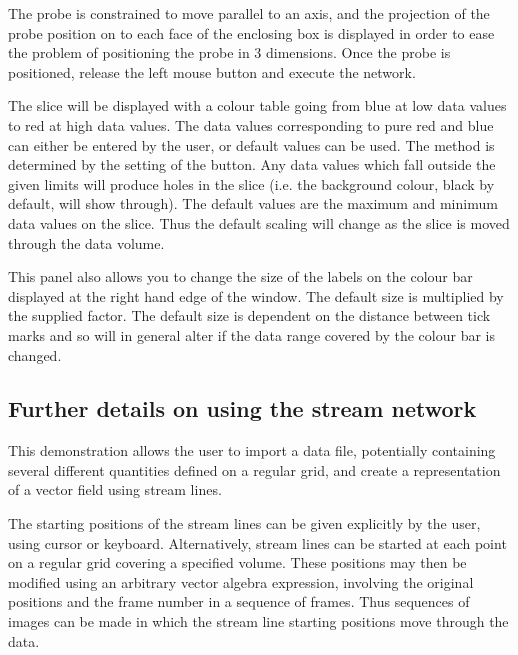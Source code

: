 \begin{description}
\begin{description}
The probe is constrained to move parallel to an axis, and the projection
of the probe position on to each face of the enclosing box is displayed
in order to ease the problem of positioning the probe in 3 dimensions.
Once the probe is positioned, release the left mouse button and execute
the network.

\end{description}

The slice will be displayed with a colour table going from blue at low
data values to red at high data values. The data values corresponding to
pure red and blue can either be entered by the user, or default values
can be used. The method is determined by the setting of the
 button. Any data values which fall outside the given
limits will produce holes in the slice (i.e. the background colour,
black by default, will show through). The default values are the maximum
and minimum data values on the slice. Thus the default scaling will
change as the slice is moved through the data volume.

This panel also allows you to change the size of the labels on the colour
bar displayed at the right hand edge of the window. The default size is
multiplied by the supplied factor.  The default size is dependent on the
distance between tick marks and so will in general alter if the data
range covered by the colour bar is changed.

\end{description}

\subsection{\label{stream}Further details on using the {\bf stream} network}
This demonstration allows the user to import a data file,
potentially containing several different quantities defined
on a regular grid, and create a representation of a vector
field using stream lines.

The starting positions of the stream lines can be given
explicitly by the user, using cursor or keyboard.
Alternatively, stream lines can be started at each point on
a regular grid covering a specified volume. These
positions may then be modified using an arbitrary vector
algebra expression, involving the original positions and
the frame number in a sequence of frames. Thus
sequences of images can be made in which the stream line
starting positions move through the data.

